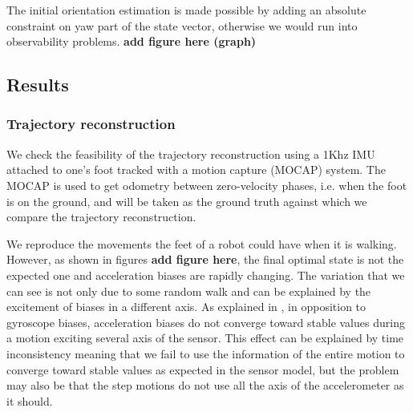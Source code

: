 The initial orientation estimation is made possible by adding an absolute constraint on yaw part of the state vector, otherwise we would run into observability problems. \textbf{add figure here (graph)}

\subsection{Results}
\subsubsection{Trajectory reconstruction}

We check the feasibility of the trajectory reconstruction using a 1Khz IMU attached to one's foot tracked with a motion capture (MOCAP) system. The MOCAP is used to get odometry between zero-velocity phases, i.e. when the foot is on the ground,
and will be taken as the ground truth against which we compare the trajectory reconstruction.

We reproduce the movements the feet of a robot could have when it is walking. However, as shown in figures \textbf{add figure here}, the final optimal state
is not the expected one and acceleration biases are rapidly changing. The variation that we can see is not only due to some random walk and can be explained by the excitement of biases in a different axis.
As explained in \cite{roussillon2011rt}, in opposition to gyroscope biases, acceleration biases do not converge toward stable values during a motion exciting several axis of the sensor. 
This effect can be explained by time inconsistency meaning that we fail
to use the information of the entire motion to converge toward stable values as expected in the sensor model, but the problem may also be that the step motions do not use all the axis of the accelerometer as it should.

